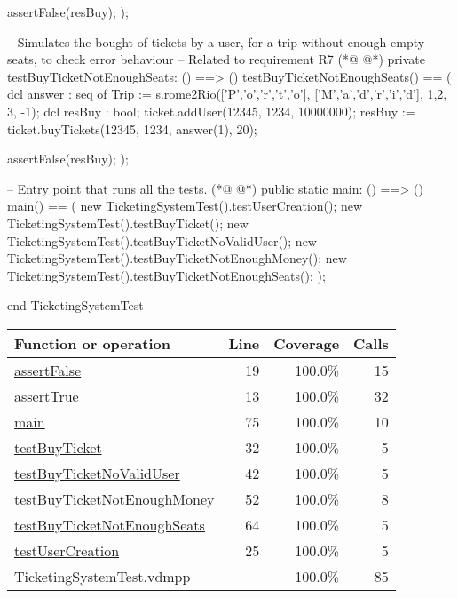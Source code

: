 \begin{vdmpp}[breaklines=true]
  assertFalse(resBuy);
 );
 
 -- Simulates the bought of tickets by a user, for a trip without enough empty seats, to check error behaviour
  -- Related to requirement R7
(*@
\label{testBuyTicketNotEnoughSeats:64}
@*)
 private testBuyTicketNotEnoughSeats: () ==> ()
 testBuyTicketNotEnoughSeats() == (
  dcl answer : seq of Trip := s.rome2Rio(['P','o','r','t','o'], ['M','a','d','r','i','d'], {1,2}, 3, -1);
  dcl resBuy : bool;
  ticket.addUser(12345, 1234, 10000000);
  resBuy := ticket.buyTickets(12345, 1234, answer(1), 20);
  
  assertFalse(resBuy);
 );
  
  -- Entry point that runs all the tests.
(*@
\label{main:75}
@*)
  public static main: () ==> ()
 main() == (
    new TicketingSystemTest().testUserCreation();
    new TicketingSystemTest().testBuyTicket();
    new TicketingSystemTest().testBuyTicketNoValidUser();
    new TicketingSystemTest().testBuyTicketNotEnoughMoney();
    new TicketingSystemTest().testBuyTicketNotEnoughSeats();
 );
  
end TicketingSystemTest
\end{vdmpp}
\bigskip
\begin{longtable}{|l|r|r|r|}
\hline
Function or operation & Line & Coverage & Calls \\
\hline
\hline
\hyperref[assertFalse:19]{assertFalse} & 19&100.0\% & 15 \\
\hline
\hyperref[assertTrue:13]{assertTrue} & 13&100.0\% & 32 \\
\hline
\hyperref[main:75]{main} & 75&100.0\% & 10 \\
\hline
\hyperref[testBuyTicket:32]{testBuyTicket} & 32&100.0\% & 5 \\
\hline
\hyperref[testBuyTicketNoValidUser:42]{testBuyTicketNoValidUser} & 42&100.0\% & 5 \\
\hline
\hyperref[testBuyTicketNotEnoughMoney:52]{testBuyTicketNotEnoughMoney} & 52&100.0\% & 8 \\
\hline
\hyperref[testBuyTicketNotEnoughSeats:64]{testBuyTicketNotEnoughSeats} & 64&100.0\% & 5 \\
\hline
\hyperref[testUserCreation:25]{testUserCreation} & 25&100.0\% & 5 \\
\hline
\hline
TicketingSystemTest.vdmpp & & 100.0\% & 85 \\
\hline
\end{longtable}

